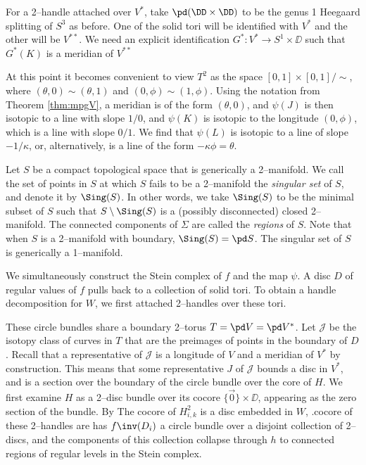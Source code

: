 	For a 2--handle attached over $V^*$, take $\pd (\DD\times\DD)$ to be the genus 1 Heegaard splitting of $S^3$ as before.
	One of the solid tori will be identified with $V^*$ and the other will be $V^{**}$.
	We need an explicit identification $G^*:V^*\to S^1\times\DD$ such that $G^*(K)$ is a meridian of $V^{**}$
	
	At this point it becomes convenient to view $T^2$ as the space $[0,1]\times[0,1]/\sim$, where $(\theta,0)\sim(\theta,1)$ and $(0,\phi)\sim(1,\phi)$.
	Using the notation from Theorem \ref{thm:mpgV}, a meridian is of the form $(\theta,0)$, and $\psi(J)$ is then isotopic to a line with slope $1/0$, and $\psi(K)$ is isotopic to the longitude $(0,\phi)$, which is a line with slope $0/1$.
	We find that $\psi(L)$ is isotopic to a line of slope $-1/\kappa$, or, alternatively, is a line of the form $-\kappa\phi=\theta$.
	
	
	
	
	
	\begin{defn}
		Let $S$ be a compact topological space that is generically a 2--manifold.
		We call the set of points in $S$ at which $S$ fails to be a 2--manifold the \emph{singular set} of $S$, and denote it by $\Sing(S)$.
		In other words, we take $\Sing(S)$ to be the minimal subset of $S$ such that $S\setminus\Sing(S)$ is a (possibly disconnected) closed 2--manifold.
		The connected components of $\Sigma$ are called the \emph{regions} of $S$.
		Note that when $S$ is a 2--manifold with boundary, $\Sing(S)=\pd S$.
		The singular set of $S$ is generically a 1--manifold.
	\end{defn}
	
	
	
	
	
	
	We simultaneously construct the Stein complex of $f$ and the map $\psi$.
	A disc $D$ of regular values of $f$ pulls back to a collection of solid tori.
	To obtain a handle decomposition for $W$, we first attached 2--handles over these tori.
	
	
	
	These circle bundles share a boundary 2--torus $T=\pd V=\pd V^*$.
	Let $\mathcal{J}$ be the isotopy class of curves in $T$ that are the preimages of points in the boundary of $D$.
	Recall that a representative of $\mathcal{J}$ is a longitude of $V$ and a meridian of $V^*$ by construction.
	This means that some representative $J$ of $\mathcal{J}$ bounds a disc in $V^*$, and is a section over the boundary of the circle bundle over the core of $H$.
	We first examine $H$ as a 2--disc bundle over its cocore $\{\vec{0}\}\times\DD$, appearing as the zero section of the bundle.
	By 
	The cocore of $H_{i,k}^2$ is a disc embedded in $W$, .cocore of these 2--handles are 
	has $f\inv(D_i)$ a circle bundle over a disjoint collection of 2--discs, and the components of this collection collapse through $h$ to connected regions of regular levels in the Stein complex.
	
